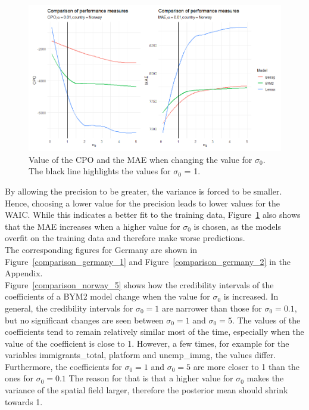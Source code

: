 \begin{figure}[H]
  \centering
  \includegraphics[width = \textwidth]{comparison_2_norway.png}
  \caption{Value of the CPO and the MAE when changing the value for $\sigma_0$. The black line highlights the values for $\sigma_0$ = 1.}
  \label{comparison_norway_2}
\end{figure}
By allowing the precision to be greater, the variance is forced to be smaller. Hence, choosing a lower value for the precision leads to lower values for the WAIC. While this indicates a better fit to the training data, Figure~\ref{comparison_norway_2} also shows that the MAE increases when a higher value for $\sigma_0$ is chosen, as the models overfit on the training data and therefore make worse predictions. \\
The corresponding figures for Germany are shown in Figure~\ref{comparison_germany_1} and Figure~\ref{comparison_germany_2} in the Appendix. \\
Figure~\ref{comparison_norway_5} shows how the credibility intervals of the coefficients of a BYM2 model change when the value for $\sigma_0$ is increased. In general, the credibility intervals for $\sigma_0 = 1$ are narrower than those for $\sigma_0 = 0.1$, but no significant changes are seen between $\sigma_0 = 1$ and $\sigma_0 = 5$. The values of the coefficients tend to remain relatively similar most of the time, especially when the value of the coefficient is close to 1. However, a few times, for example for the variables immigrants\_total, platform and unemp\_immg, the values differ. Furthermore, the coefficients for $\sigma_0 = 1$ and $\sigma_0 = 5$ are more closer to 1 than the ones for $\sigma_0=0.1$ The reason for that is that a higher value for $\sigma_0$ makes the variance of the spatial field larger, therefore the posterior mean should shrink towards 1.
